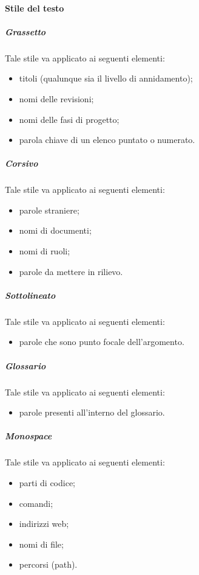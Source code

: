 			\paragraph{Stile del testo}
				\subparagraph{Grassetto}
					Tale stile va applicato ai seguenti elementi:
					\begin{itemize}
						\item titoli (qualunque sia il livello di annidamento);
						\item nomi delle revisioni;
						\item nomi delle fasi di progetto;
						\item parola chiave di un elenco puntato o numerato.
					\end{itemize}
				\subparagraph{Corsivo}
					Tale stile va applicato ai seguenti elementi:
					\begin{itemize}
						\item parole straniere;
						\item nomi di documenti;
						\item nomi di ruoli;
						\item parole da mettere in rilievo.
					\end{itemize}
				\subparagraph{Sottolineato}
					Tale stile va applicato ai seguenti elementi:
					\begin{itemize}
						\item parole che sono punto focale dell’argomento.
					\end{itemize}
				\subparagraph{Glossario}
					Tale stile va applicato ai seguenti elementi:
					\begin{itemize}
						\item parole presenti all’interno del glossario.
					\end{itemize}
				\subparagraph{Monospace}
					Tale stile va applicato ai seguenti elementi:
					\begin{itemize}
						\item parti di codice;
						\item comandi;
						\item indirizzi web;
						\item nomi di file;
						\item percorsi (path).
					\end{itemize}
